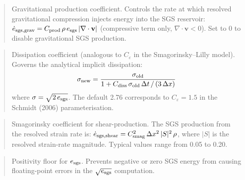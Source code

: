 \label{param:sgs_C_prod}

\begin{quote}
Gravitational production coefficient.  Controls the rate at which
resolved gravitational compression injects energy into the SGS
reservoir: $\dot{e}_{\rm sgs,grav} = C_{\rm prod}\,\rho\,e_{\rm sgs}\,
|\nabla\cdot\mathbf{v}|$ (compressive term only, $\nabla\cdot\mathbf{v}<0$).
Set to 0 to disable gravitational SGS production.
\end{quote}

\label{param:sgs_C_diss}

\begin{quote}
Dissipation coefficient (analogous to $C_\varepsilon$ in the
Smagorinsky--Lilly model).  Governs the analytical implicit dissipation:
\[
  \sigma_{\rm new} = \frac{\sigma_{\rm old}}
  {1 + C_{\rm diss}\,\sigma_{\rm old}\,\Delta t \,/\, (3\,\Delta x)}
\]
where $\sigma = \sqrt{2\,e_{\rm sgs}}$.  The default 2.76 corresponds
to $C_\varepsilon = 1.5$ in the Schmidt (2006) parameterisation.

\end{quote}

\label{param:sgs_C_smag}

\begin{quote}
Smagorinsky coefficient for shear-production.  The SGS production from
the resolved strain rate is:
$\dot{e}_{\rm sgs,shear} = C_{\rm smag}^2\,\Delta x^2\,|S|^2\,\rho$,
where $|S|$ is the resolved strain-rate magnitude.  Typical values
range from 0.05 to 0.20.
\end{quote}

\label{param:sgs_floor}

\begin{quote}
Positivity floor for $e_{\rm sgs}$.  Prevents negative or zero SGS
energy from causing floating-point errors in the $\sqrt{e_{\rm sgs}}$
computation.
\end{quote}

\label{param:sgs_cap}

